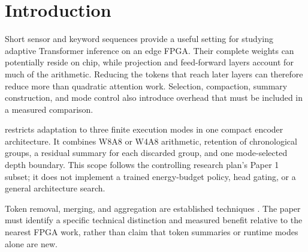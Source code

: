 \section{Introduction}
\label{sec:introduction}
Short sensor and keyword sequences provide a useful setting for studying
adaptive Transformer inference on an edge FPGA. Their complete weights can
potentially reside on chip, while projection and feed-forward layers account
for much of the arithmetic. Reducing the tokens that reach later layers can
therefore reduce more than quadratic attention work. Selection, compaction,
summary construction, and mode control also introduce overhead that must be
included in a measured comparison.

\projectname{} restricts adaptation to three finite execution modes in one
compact encoder architecture. It combines W8A8 or W4A8 arithmetic, retention of
chronological groups, a residual summary for each discarded group, and one
mode-selected depth boundary. This scope follows the controlling research
plan's Paper 1 subset; it does not implement a trained energy-budget policy,
head gating, or a general architecture search.

Token removal, merging, and aggregation are established techniques
\cite{arxiv210602034,arxiv220207800,arxiv221009461,arxiv231201026}.
The paper must identify a specific technical distinction and measured benefit
relative to the nearest FPGA work, rather than claim that token summaries or
runtime modes alone are new.
